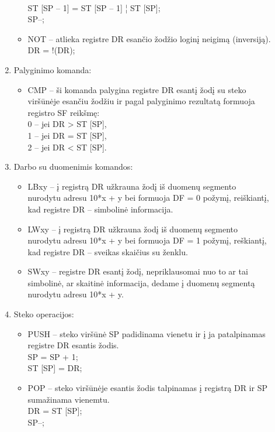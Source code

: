 \begin{description}
\begin{enumerate}
\begin{itemize}
\\ST [SP – 1] = ST [SP – 1] ¦ ST [SP];\\ SP--;\\
\item NOT – atlieka registre DR esančio žodžio loginį neigimą (inversiją). \leavevmode
\\DR = !(DR);\\
\end{itemize}
\item Palyginimo komanda:
\begin{itemize}
\item CMP – ši komanda palygina registre DR esantį žodį su steko viršūnėje esančiu žodžiu ir pagal palyginimo rezultatą formuoja registro SF reikšmę: \leavevmode
\\0 – jei DR > ST [SP], 
\\1 – jei DR = ST [SP],
\\ 2 – jei DR < ST [SP].
\end{itemize}
\item Darbo su duomenimis komandos:
\begin{itemize}
\item LBxy – į registrą DR užkrauna žodį iš duomenų segmento nurodytu adresu 10*x + y bei formuoja DF = 0 požymį, reiškiantį, kad registre DR – simbolinė informacija.\\
\item LWxy – į registrą DR užkrauna žodį iš duomenų segmento nurodytu adresu 10*x + y bei formuoja DF = 1 požymį, reškiantį, kad registre DR – sveikas skaičius su ženklu.\\
\item SWxy – registre DR esantį žodį, nepriklausomai nuo to ar tai simbolinė, ar skaitinė informacija, dedame į duomenų segmentą nurodytu adresu 10*x + y.\\
\end{itemize}
\item Steko operacijos:
\begin{itemize}
\item PUSH – steko viršūnė SP padidinama vienetu ir į ja patalpinamas registre DR esantis žodis.\leavevmode
\\SP = SP + 1; \\ST [SP] = DR;
\item POP – steko viršūnėje esantis žodis talpinamas į registrą DR ir SP sumažinama vienemtu.\leavevmode
\\DR = ST [SP];\\ SP--;
\end{itemize}

\end{enumerate}
\end{description}

